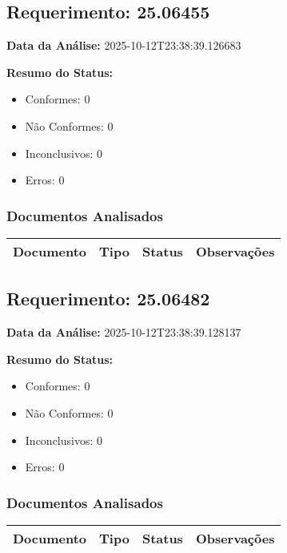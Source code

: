 \documentclass[12pt,a4paper]{article}
\begin{document}
\subsection{Requerimento: 25.06455}

\textbf{Data da Análise:} 2025-10-12T23:38:39.126683

\textbf{Resumo do Status:}
\begin{itemize}
    \item Conformes: 0
    \item Não Conformes: 0
    \item Inconclusivos: 0
    \item Erros: 0
\end{itemize}

\subsubsection{Documentos Analisados}

\begin{longtable}{|p{4cm}|p{2cm}|p{2cm}|p{6cm}|}
\hline
\textbf{Documento} & \textbf{Tipo} & \textbf{Status} & \textbf{Observações} \\
\hline
\endhead
\end{longtable}


\subsection{Requerimento: 25.06482}

\textbf{Data da Análise:} 2025-10-12T23:38:39.128137

\textbf{Resumo do Status:}
\begin{itemize}
    \item Conformes: 0
    \item Não Conformes: 0
    \item Inconclusivos: 0
    \item Erros: 0
\end{itemize}

\subsubsection{Documentos Analisados}

\begin{longtable}{|p{4cm}|p{2cm}|p{2cm}|p{6cm}|}
\hline
\textbf{Documento} & \textbf{Tipo} & \textbf{Status} & \textbf{Observações} \\
\hline
\endhead
\end{longtable}
\end{document}
